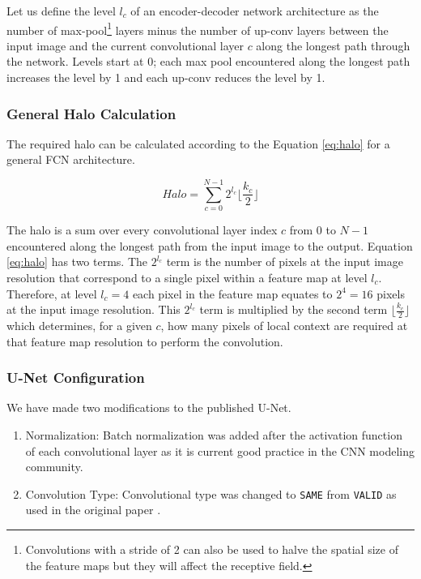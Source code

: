 \documentclass[runningheads]{llncs}
\begin{document}
Let us define the level $l_{c}$ of an encoder-decoder network architecture as the number of max-pool\footnote{Convolutions with a stride of 2 can also be used to halve the spatial size of the feature maps but they will affect the receptive field.} layers minus the number of up-conv layers between the input image and the current convolutional layer $c$ along the longest path through the network. Levels start at 0; each max pool encountered along the longest path increases the level by 1 and each up-conv reduces the level by 1. 


\subsubsection{General Halo Calculation}

The required halo can be calculated according to the Equation \ref{eq:halo} for a general FCN architecture. 

\begin{equation}
Halo = \sum_{c=0}^{N-1} 2^{l_c} \lfloor \frac{k_c}{2} \rfloor
\label{eq:halo}
\end{equation}

The halo is a sum over every convolutional layer index $c$ from $0$ to $N-1$ encountered along the longest path from the input image to the output. 
Equation \ref{eq:halo} has two terms. The $2^{l_c}$ term is the number of pixels at the input image resolution that correspond to a single pixel within a feature map at level $l_c$. 
Therefore, at level $l_c=4$ each pixel in the feature map equates to $2^4 = 16$ pixels at the input image resolution. This $2^{l_c}$ term is multiplied by the second term $\lfloor \frac{k_c}{2} \rfloor$ which determines, for a given $c$, how many pixels of local context are required at that feature map resolution to perform the convolution.

\subsubsection{U-Net Configuration}

We have made two modifications to the published U-Net. 

\begin{enumerate}
	\item Normalization: Batch normalization \cite{ioffe2015batch} was added after the activation function of each convolutional layer as it is current good practice in the CNN modeling community. 
	\item Convolution Type: Convolutional type was changed to \texttt{SAME} from \texttt{VALID} as used in the original paper \cite{Ronneberger2015a}.
\end{enumerate} 
\end{document}
